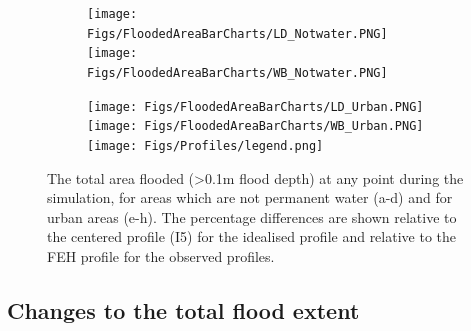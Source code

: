 \documentclass[APA,Times2COL]{WileyNJDv5}
\begin{document}
\begin{figure}[h!]
  \begin{subfigure}[b]{\textwidth}
    \centering
    \texttt{[image: Figs/FloodedAreaBarCharts/LD\_Notwater.PNG]}
    \texttt{[image: Figs/FloodedAreaBarCharts/WB\_Notwater.PNG]}
  \end{subfigure}
  \begin{subfigure}[b]{\textwidth}
    \centering
    \texttt{[image: Figs/FloodedAreaBarCharts/LD\_Urban.PNG]}
    \texttt{[image: Figs/FloodedAreaBarCharts/WB\_Urban.PNG]}
    \centering
    \texttt{[image: Figs/Profiles/legend.png]}
  \end{subfigure}
\caption{The total area flooded (\textgreater 0.1m flood depth) at any point during the simulation, for areas which are not permanent water (a-d) and for urban areas (e-h). The percentage differences are shown relative to the centered profile (I5) for the idealised profile and relative to the FEH profile for the observed profiles.} \label{fig:total_flooded_area} 
\end{figure}

\subsection{Changes to the total flood extent}\label{subsec:model}
\end{document}
